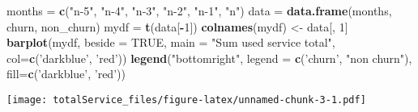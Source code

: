 \documentclass[]{article}
\newenvironment{Shaded}{\begin{snugshade}}{\end{snugshade}}
\newcommand{\KeywordTok}[1]{\textcolor[rgb]{0.13,0.29,0.53}{\textbf{#1}}}
\newcommand{\DataTypeTok}[1]{\textcolor[rgb]{0.13,0.29,0.53}{#1}}
\newcommand{\DecValTok}[1]{\textcolor[rgb]{0.00,0.00,0.81}{#1}}
\newcommand{\StringTok}[1]{\textcolor[rgb]{0.31,0.60,0.02}{#1}}
\newcommand{\OtherTok}[1]{\textcolor[rgb]{0.56,0.35,0.01}{#1}}
\newcommand{\OperatorTok}[1]{\textcolor[rgb]{0.81,0.36,0.00}{\textbf{#1}}}
\newcommand{\NormalTok}[1]{#1}
\begin{document}
\begin{Shaded}
\begin{Highlighting}[]
\NormalTok{months =}\StringTok{ }\KeywordTok{c}\NormalTok{(}\StringTok{"n-5"}\NormalTok{, }\StringTok{"n-4"}\NormalTok{, }\StringTok{"n-3"}\NormalTok{, }\StringTok{"n-2"}\NormalTok{, }\StringTok{"n-1"}\NormalTok{, }\StringTok{"n"}\NormalTok{)}
\NormalTok{data =}\StringTok{ }\KeywordTok{data.frame}\NormalTok{(months, churn, non_churn)}
\NormalTok{mydf =}\StringTok{ }\KeywordTok{t}\NormalTok{(data[}\OperatorTok{-}\DecValTok{1}\NormalTok{])}
\KeywordTok{colnames}\NormalTok{(mydf) <-}\StringTok{ }\NormalTok{data[, }\DecValTok{1}\NormalTok{]}
\KeywordTok{barplot}\NormalTok{(mydf, }\DataTypeTok{beside =} \OtherTok{TRUE}\NormalTok{, }\DataTypeTok{main =} \StringTok{"Sum  used service total"}\NormalTok{, }\DataTypeTok{col=}\KeywordTok{c}\NormalTok{(}\StringTok{'darkblue'}\NormalTok{, }\StringTok{'red'}\NormalTok{))}
\KeywordTok{legend}\NormalTok{(}\StringTok{"bottomright"}\NormalTok{, }\DataTypeTok{legend =} \KeywordTok{c}\NormalTok{(}\StringTok{'churn'}\NormalTok{, }\StringTok{"non churn"}\NormalTok{), }\DataTypeTok{fill=}\KeywordTok{c}\NormalTok{(}\StringTok{'darkblue'}\NormalTok{, }\StringTok{'red'}\NormalTok{))}
\end{Highlighting}
\end{Shaded}

\texttt{[image: totalService\_files/figure-latex/unnamed-chunk-3-1.pdf]}
\end{document}
